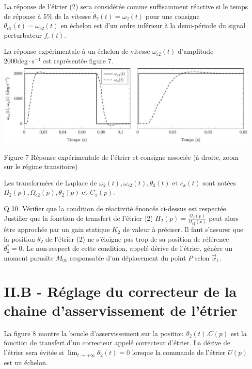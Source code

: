 \documentclass[10pt]{article}
\begin{document}
La réponse de l'étrier (2) sera considérée comme suffisamment réactive si le temps de réponse à $5 \%$ de la vitesse $\dot{\theta}_{2}(t)=\omega_{2}(t)$ pour une consigne $\dot{\theta}_{c 2}(t)=\omega_{c 2}(t)$ en échelon est d'un ordre inférieur à la demi-période du signal perturbateur $f_{c}(t)$.

La réponse expérimentale à un échelon de vitesse $\omega_{c 2}(t)$ d'amplitude $2000 \mathrm{deg} \cdot \mathrm{s}^{-1}$ est représentée figure 7.
\includegraphics[max width=\textwidth, center]{2023_07_26_54f5e859400a10e656ddg-05(1)}

Figure 7 Réponse expérimentale de l'étrier et consigne associée (à droite, zoom sur le régime transitoire)

Les transformées de Laplace de $\omega_{2}(t), \omega_{c 2}(t), \theta_{2}(t)$ et $c_{x}(t)$ sont notées $\Omega_{2}(p), \Omega_{c 2}(p), \theta_{2}(p)$ et $C_{x}(p)$.

Q 10. Vérifier que la condition de réactivité énoncée ci-dessus est respectée. Justifier que la fonction de transfert de l'étrier (2) $H_{2}(p)=\frac{\Omega_{2}(p)}{\Omega_{c 2}(p)}$ peut alors être approchée par un gain statique $K_{2}$ de valeur à préciser. Il faut s'assurer que la position $\theta_{2}$ de l'étrier (2) ne s'éloigne pas trop de sa position de référence $\theta_{2}^{*}=0$. Le non-respect de cette condition, appelé dérive de l'étrier, génère un moment parasite $M_{01}$ responsable d'un déplacement du point $P$ selon $\vec{x}_{1}$.

\section{II.B - Réglage du correcteur de la chaine d'asservissement de l'étrier}
La figure 8 montre la boucle d'asservissement sur la position $\theta_{2}(t) . C(p)$ est la fonction de transfert d'un correcteur appelé correcteur d'étrier. La dérive de l'étrier sera évitée si $\lim _{t \rightarrow+\infty} \theta_{2}(t)=0$ lorsque la commande de l'étrier $U(p)$ est un échelon.
\end{document}
